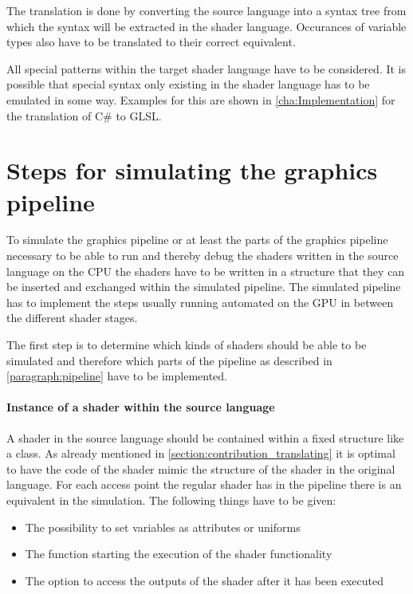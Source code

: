 The translation is done by converting the source language into a syntax tree from which the syntax will be extracted in the shader language. Occurances of variable types also have to be translated to their correct equivalent.

All special patterns within the target shader language have to be considered. It is possible that special syntax only existing in the shader language has to be emulated in some way. Examples for this are shown in \autoref{cha:Implementation} for the translation of C\# to GLSL.

\section{Steps for simulating the graphics pipeline}
\label{section:contribution_simulating}

To simulate the graphics pipeline or at least the parts of the graphics pipeline necessary to be able to run and thereby debug the shaders written in the source language on the CPU the shaders have to be written in a structure that they can be inserted and exchanged within the simulated pipeline. The simulated pipeline has to implement the steps usually running automated on the GPU in between the different shader stages.

The first step is to determine which kinds of shaders should be able to be simulated and therefore which parts of the pipeline as described in \autoref{paragraph:pipeline} have to be implemented.

\paragraph{Instance of a shader within the source language}

A shader in the source language should be contained within a fixed structure like a class.
As already mentioned in \autoref{section:contribution_translating} it is optimal to have the code of the shader mimic the structure of the shader in the original language. For each access point the regular shader has in the pipeline there is an equivalent in the simulation. The following things have to be given:
\begin{itemize}
\item The possibility to set variables as attributes or uniforms
\item The function starting the execution of the shader functionality
\item The option to access the outputs of the shader after it has been executed
\end{itemize}


